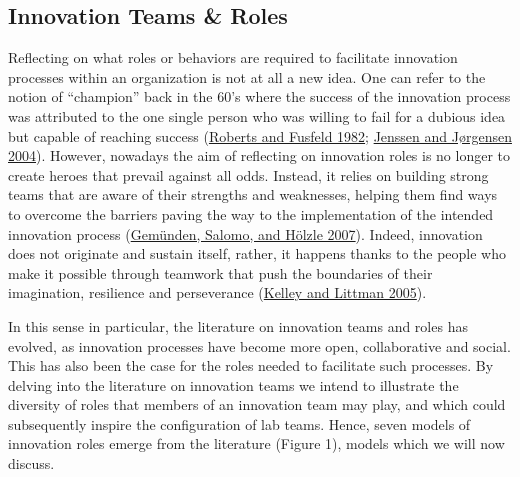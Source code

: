 \documentclass[AMA,STIX1COL,APA,STIX2COL]{WileyNJD-v2}
\begin{document}
\hypertarget{innovation-teams-roles}{%
\subsection{Innovation Teams \& Roles}\label{innovation-teams-roles}}

Reflecting on what roles or behaviors are required to facilitate
innovation processes within an organization is not at all a new idea.
One can refer to the notion of ``champion'' back in the 60's where the
success of the innovation process was attributed to the one single
person who was willing to fail for a dubious idea but capable of
reaching success (\protect\hyperlink{ref-Roberts1982}{Roberts and
Fusfeld 1982}; \protect\hyperlink{ref-Jenssen2004}{Jenssen and Jørgensen
2004}). However, nowadays the aim of reflecting on innovation roles is
no longer to create heroes that prevail against all odds. Instead, it
relies on building strong teams that are aware of their strengths and
weaknesses, helping them find ways to overcome the barriers paving the
way to the implementation of the intended innovation process
(\protect\hyperlink{ref-Gemunden2007}{Gemünden, Salomo, and Hölzle
2007}). Indeed, innovation does not originate and sustain itself,
rather, it happens thanks to the people who make it possible through
teamwork that push the boundaries of their imagination, resilience and
perseverance (\protect\hyperlink{ref-Kelley2005}{Kelley and Littman
2005}).

In this sense in particular, the literature on innovation teams and
roles has evolved, as innovation processes have become more open,
collaborative and social. This has also been the case for the roles
needed to facilitate such processes. By delving into the literature on
innovation teams we intend to illustrate the diversity of roles that
members of an innovation team may play, and which could subsequently
inspire the configuration of lab teams. Hence, seven models of
innovation roles emerge from the literature (Figure 1), models which we
will now discuss.
\end{document}
